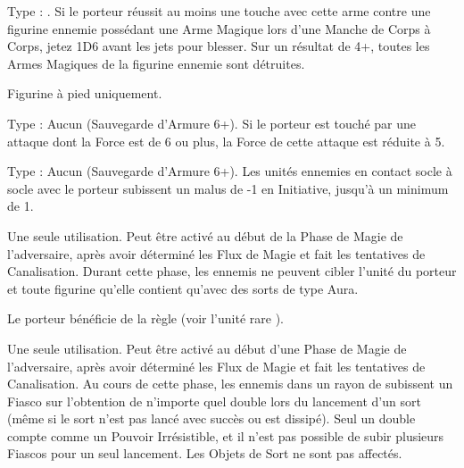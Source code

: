 Type : \ironfist{}. Si le porteur réussit au moins une touche avec cette arme contre une figurine ennemie possédant une Arme Magique lors d'une Manche de Corps à Corps, jetez 1D6 avant les jets pour blesser. Sur un résultat de 4+, toutes les Armes Magiques de la figurine ennemie sont détruites.

\endpricelist

\armymagicalarmour

\startpricelist

Figurine à pied uniquement.

Type : Aucun (Sauvegarde d'Armure 6+). Si le porteur est touché par une attaque dont la Force est de 6 ou plus, la Force de cette attaque est réduite à 5.

Type : Aucun (Sauvegarde d'Armure 6+). Les unités ennemies en contact socle à socle avec le porteur subissent un malus de -1 en Initiative, jusqu'à un minimum de 1.

\endpricelist

\armytalismans

\startpricelist

Une seule utilisation. Peut être activé au début de la Phase de Magie de l'adversaire, après avoir déterminé les Flux de Magie et fait les tentatives de Canalisation. Durant cette phase, les \wizards{} ennemis ne peuvent cibler l'unité du porteur et toute figurine qu'elle contient qu'avec des sorts de type Aura.

\endpricelist

\armyenchanteditems

\startpricelist

Le porteur bénéficie de la règle \stoneskin{} (voir l'unité rare \rockaurochs{}).

\endpricelist

\armyarcaneitems

\startpricelist

Une seule utilisation. Peut être activé au début d'une Phase de Magie de l'adversaire, après avoir déterminé les Flux de Magie et fait les tentatives de Canalisation. Au cours de cette phase, les \wizards{} ennemis dans un rayon de  subissent un Fiasco sur l'obtention de n'importe quel double lors du lancement d'un sort (même si le sort n'est pas lancé avec succès ou est dissipé). Seul un double  compte comme un Pouvoir Irrésistible, et il n'est pas possible de subir plusieurs Fiascos pour un seul lancement. Les Objets de Sort ne sont pas affectés.

